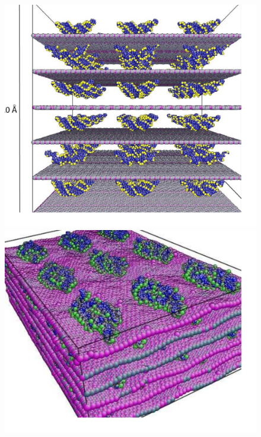 \begin{compactenum}[a)]
\begin{figure} 
        \begin{center}
           \includegraphics[scale=0.3]{subproject1-bioclays/pic1}
           \includegraphics[scale=0.3]{subproject1-bioclays/pic2}

\end{center}
\end{figure}
\end{compactenum}

